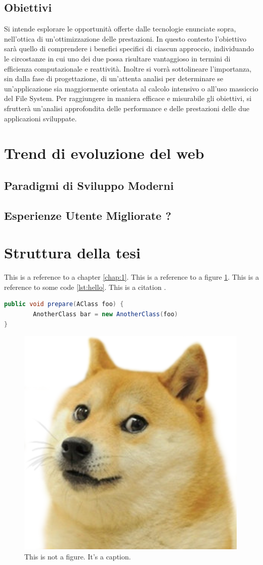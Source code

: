 \subsection{Obiettivi}
Si intende esplorare le opportunità offerte dalle tecnologie enunciate sopra, nell'ottica di un'ottimizzazione delle prestazioni.
In questo contesto l'obiettivo sarà quello di comprendere i benefici specifici di ciascun approccio, individuando le circostanze in cui uno dei due possa risultare vantaggioso in termini di efficienza computazionale e reattività. Inoltre si vorrà sottolineare l'importanza, sin dalla fase di progettazione, di un'attenta analisi per determinare se un'applicazione sia maggiormente orientata al calcolo intensivo o all'uso massiccio del File System. 
Per raggiungere in maniera efficace e misurabile gli obiettivi, si sfrutterà un'analisi approfondita delle performance e delle prestazioni delle due applicazioni sviluppate.

\newpage
\section{Trend di evoluzione del web}
\label{sec:Trend}
\subsection{Paradigmi di Sviluppo Moderni}

\subsection{Esperienze Utente Migliorate ?}



\section{Struttura della tesi}
\label{sec:struttura}

This is a reference to a chapter \ref{chap:1}. This is a reference to a figure \ref{fig:doge}. This is a reference to some code \ref{lst:hello}. This is a citation \cite{famous:paper}.



\begin{lstlisting}[language=Java, label=lst:java, caption={Some code in another language than the default one}]
public void prepare(AClass foo) {
        AnotherClass bar = new AnotherClass(foo)
}
\end{lstlisting}


\begin{figure}
\begin{center}
\includegraphics[width=0.3\columnwidth]{images/doge.png}
\end{center}
\caption{This is not a figure. It's a caption.}
\label{fig:doge}
\end{figure}
